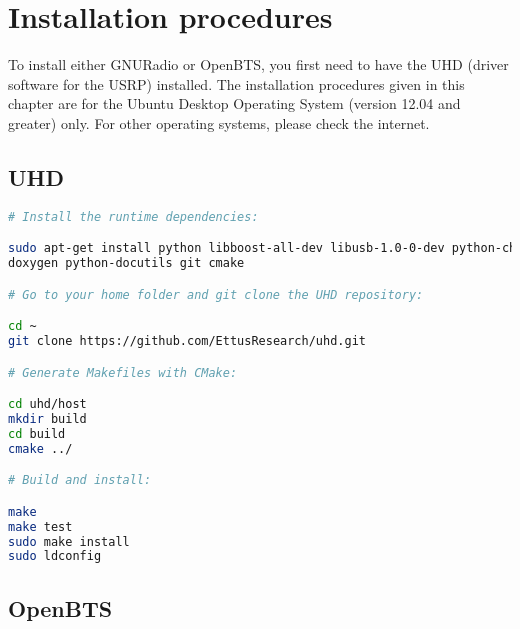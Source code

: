 \chapter{Installation procedures}
To install either GNURadio or OpenBTS, you first need to have the UHD (driver
software for the USRP) installed. The installation procedures given in this 
chapter are for the Ubuntu Desktop Operating System (version 12.04 and
greater) only. For other operating systems, please check the internet.
\section{UHD}
\begin{lstlisting}[language=bash]
# Install the runtime dependencies:

sudo apt-get install python libboost-all-dev libusb-1.0-0-dev python-cheetah \
doxygen python-docutils git cmake

# Go to your home folder and git clone the UHD repository:

cd ~
git clone https://github.com/EttusResearch/uhd.git

# Generate Makefiles with CMake:

cd uhd/host
mkdir build
cd build
cmake ../

# Build and install:

make
make test
sudo make install
sudo ldconfig
\end{lstlisting}


\section{OpenBTS}

